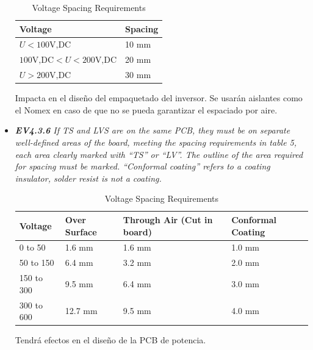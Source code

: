 \begin{itemize}
	\begin{table}[H]
		\centering
		\caption{Voltage Spacing Requirements}
		\begin{tabular}{|l|l|}
			\hline
			Voltage         & Spacing     \\ \hline
			\(U < 100 \text{V,DC}\)  & 10 mm       \\ \hline
			\(100 \text{V,DC} < U < 200 \text{V,DC}\) & 20 mm       \\ \hline
			\(U > 200 \text{V,DC}\)  & 30 mm       \\ \hline
		\end{tabular}
	\end{table} Impacta en el diseño del empaquetado del inversor.  Se usarán aislantes como el Nomex en caso de que no se pueda garantizar el espaciado por aire.
    \item \textit{\textbf{EV4.3.6} If TS and LVS are on the same PCB, they must be on separate well-defined areas of the board, meeting the spacing requirements in table 5, each area clearly marked with “TS” or “LV”. The outline of the area required for spacing must  be marked. “Conformal coating” refers to a coating insulator, solder resist is not a coating.}
    
	\begin{table}[H]
		\centering
		\caption{Voltage Spacing Requirements}
		\begin{tabular}{|l|l|l|l|}
			\hline
			Voltage & Over Surface & Through Air (Cut in board) & Conformal Coating \\
			\hline
			0 to 50 & 1.6 mm & 1.6 mm & 1.0 mm \\
			\hline
			50 to 150 & 6.4 mm & 3.2 mm & 2.0 mm \\
			\hline
			150 to 300 & 9.5 mm & 6.4 mm & 3.0 mm \\
			\hline
			300 to 600 & 12.7 mm & 9.5 mm & 4.0 mm \\
			\hline
		\end{tabular}
	\end{table} Tendrá efectos en el diseño de la PCB de potencia.


\end{itemize}
